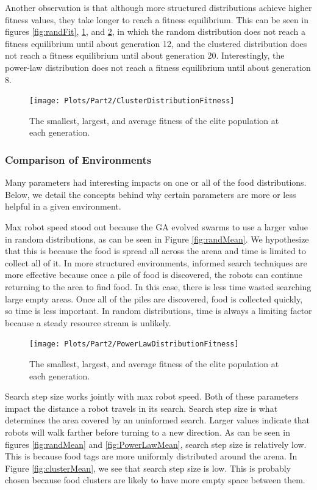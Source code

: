 \documentclass{acm_proc_article-sp}
\begin{document}
Another observation is that although more structured distributions achieve higher fitness values, they take longer to reach a fitness equilibrium. This can be seen in figures \ref{fig:randFit}, \ref{fig:clusterFit}, and \ref{fig:PowerLawFit}, in which the random distribution does not reach a fitness equilibrium until about generation 12, and the clustered distribution does not reach a fitness equilibrium until about generation 20. Interestingly, the power-law distribution does not reach a fitness equilibrium until about generation 8.

\begin{figure}[h]
\texttt{[image: Plots/Part2/ClusterDistributionFitness]}
\caption{The smallest, largest, and average fitness of the elite population at each generation.} \label{fig:clusterFit}
\end{figure}

\subsubsection{Comparison of Environments}

Many parameters had interesting impacts on one or all of the food distributions. Below, we detail the concepts behind why certain parameters are more or less helpful in a given environment. 

Max robot speed stood out because the GA evolved swarms to use a larger value in random distributions, as can be seen in Figure \ref{fig:randMean}. We hypothesize that this is because the food is spread all across the arena and time is limited to collect all of it. In more structured environments, informed search techniques are more effective because once a pile of food is discovered, the robots can continue returning to the area to find food. In this case, there is less time wasted searching large empty areas. Once all of the piles are discovered, food is collected quickly, so time is less important. In random distributions, time is always a limiting factor because a steady resource stream is unlikely.

\begin{figure}[h]
\texttt{[image: Plots/Part2/PowerLawDistributionFitness]}
\caption{The smallest, largest, and average fitness of the elite population at each generation.} \label{fig:PowerLawFit}
\end{figure}

Search step size works jointly with max robot speed. Both of these parameters impact the distance a robot travels in its search. Search step size is what determines the area covered by an uninformed search. Larger values indicate that robots will walk farther before turning to a new direction. As can be seen in figures \ref{fig:randMean} and \ref{fig:PowerLawMean}, search step size is relatively low. This is because food tags are more uniformly distributed around the arena. In Figure \ref{fig:clusterMean}, we see that search step size is low. This is probably chosen because food clusters are likely to have more empty space between them.
\end{document}
